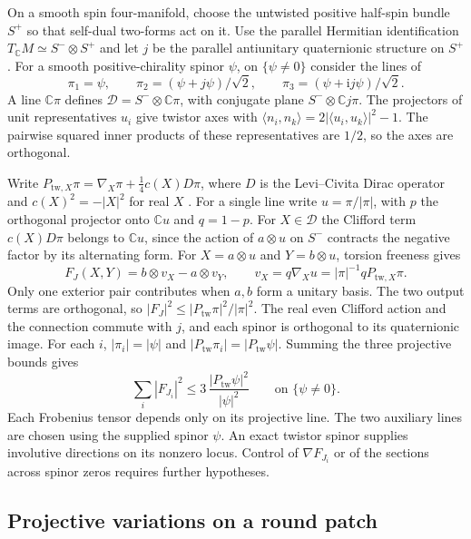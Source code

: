 \documentclass[11pt]{article}
\numberwithin{equation}{section}
\theoremstyle{definition}
\theoremstyle{remark}
\begin{document}
On a smooth spin four-manifold, choose the untwisted positive
half-spin bundle \(S^+\) so that self-dual two-forms act on it.
Use the parallel Hermitian identification \(T_{\mathbb C}M
\simeq S^-\otimes S^+\) and let \(j\) be the parallel antiunitary
quaternionic structure on \(S^+\)
\cite[\S1]{AHS1978}. For a smooth positive-chirality spinor
\(\psi\), on \(\{\psi\ne0\}\) consider the lines of
\[
 \pi_1=\psi,\qquad
 \pi_2=(\psi+j\psi)/\sqrt2,\qquad
 \pi_3=(\psi+\mathrm i j\psi)/\sqrt2 .
\]
A line \(\mathbb C\pi\) defines \(\mathcal D=S^-\otimes\mathbb C\pi\),
with conjugate plane \(S^-\otimes\mathbb C j\pi\). The
projectors of unit representatives \(u_i\) give twistor axes
with \(\langle n_i,n_k\rangle=2|\langle u_i,u_k\rangle|^2-1\).
The pairwise squared inner products of these representatives
are \(1/2\), so the axes are orthogonal.

Write \(P_{\mathrm{tw},X}\pi=\nabla_X\pi+\tfrac14 c(X)D\pi\),
where \(D\) is the Levi--Civita Dirac operator and
\(c(X)^2=-|X|^2\) for real \(X\)
\cite[eq.~(1.1)]{Friedrich1990TwistorSpinors}. For a single line
write \(u=\pi/|\pi|\), with \(p\) the orthogonal projector onto
\(\mathbb C u\) and \(q=1-p\). For \(X\in \mathcal D\) the
Clifford term \(c(X)D\pi\) belongs to \(\mathbb C u\), since
the action of \(a\otimes u\) on \(S^-\) contracts the
negative factor by its alternating form. For \(X=a\otimes u\)
and \(Y=b\otimes u\), torsion freeness gives
\[
 F_J(X,Y)=b\otimes v_X-a\otimes v_Y,\qquad
 v_X=q\nabla_Xu=|\pi|^{-1}q P_{\mathrm{tw},X}\pi .
\]
Only one exterior pair contributes when \(a,b\) form a unitary
basis. The two output terms are orthogonal, so
\(|F_J|^2\le |P_{\mathrm{tw}}\pi|^2/|\pi|^2\).
The real even Clifford action and the connection commute with
\(j\), and each spinor is orthogonal to its quaternionic image.
For each \(i\), \(|\pi_i|=|\psi|\) and
\(|P_{\mathrm{tw}}\pi_i|=|P_{\mathrm{tw}}\psi|\). Summing the
three projective bounds gives
\[
 \sum_i|F_{J_i}|^2\le 3\,\frac{|P_{\mathrm{tw}}\psi|^2}{|\psi|^2}
       \qquad\text{on }\{\psi\ne0\}.
\]
Each Frobenius tensor depends only on its projective line. The two
auxiliary lines are chosen using the supplied spinor \(\psi\).
An exact twistor spinor supplies involutive directions on its
nonzero locus. Control of \(\nabla F_{J_i}\) or of the sections
across spinor zeros requires further hypotheses.

\subsection{Projective variations on a round patch}
\label{secjet:germ-projective}
\end{document}
